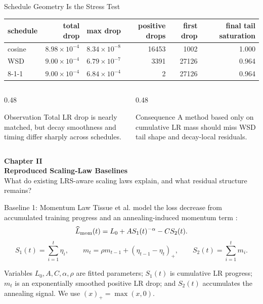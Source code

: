 \documentclass[fontset=fandol,aspectratio=169,10pt]{ctexbeamer}
\begin{document}
\begin{frame}{Schedule Geometry Is the Stress Test}
  \begin{table}
    \centering
    \scriptsize
    \begin{tabular}{lrrrrr}
      \toprule
      schedule & total drop & max drop & positive drops & first drop & final tail saturation\\
      \midrule
      cosine & \(8.98{\times}10^{-4}\) & \(8.34{\times}10^{-8}\) & 16453 & 1002 & 1.000\\
      WSD & \(9.00{\times}10^{-4}\) & \(6.79{\times}10^{-7}\) & 3391 & 27126 & 0.964\\
      8-1-1 & \(9.00{\times}10^{-4}\) & \(6.84{\times}10^{-4}\) & 2 & 27126 & 0.964\\
      \bottomrule
    \end{tabular}
  \end{table}
  \begin{columns}[T,onlytextwidth]
    \begin{column}{0.48\textwidth}
      \begin{block}{Observation}
        Total LR drop is nearly matched, but decay smoothness and timing differ
        sharply across schedules.
      \end{block}
    \end{column}
    \begin{column}{0.48\textwidth}
      \begin{block}{Consequence}
        A method based only on cumulative LR mass should miss WSD tail shape and
        decay-local residuals.
      \end{block}
    \end{column}
  \end{columns}
\end{frame}

\begin{frame}[plain]
  \begin{center}
    \vspace{2.2em}
    {\Large\color{tdltBlue}\textbf{Chapter II}}\\[0.5em]
    {\huge\textbf{Reproduced Scaling-Law Baselines}}\\[0.8em]
    \small What do existing LRS-aware scaling laws explain, and what residual structure remains?
  \end{center}
\end{frame}

\begin{frame}{Baseline 1: Momentum Law}
  Tissue et al. model the loss decrease from accumulated training progress and
  an annealing-induced momentum term \cite{tissue2026scaling}:
  \[
    \widehat L_{\rm mom}(t)=L_0+A S_1(t)^{-\alpha}-C S_2(t).
  \]
  \[
    S_1(t)=\sum_{i=1}^{t}\eta_i,\qquad
    m_t=\rho m_{t-1}+(\eta_{t-1}-\eta_t)_+,\qquad
    S_2(t)=\sum_{i=1}^{t}m_i .
  \]
  \begin{block}{Variables}
    \(L_0,A,C,\alpha,\rho\) are fitted parameters; \(S_1(t)\) is cumulative
    LR progress; \(m_t\) is an exponentially smoothed positive LR drop; and
    \(S_2(t)\) accumulates the annealing signal. We use
    \((x)_+=\max(x,0)\).
  \end{block}
\end{frame}
\end{document}

